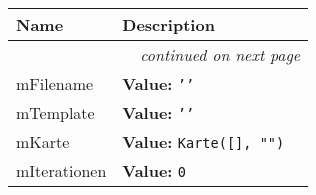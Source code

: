     \vspace{-1cm}
\hspace{\varindent}\begin{longtable}{|p{\varnamewidth}|p{\vardescrwidth}|l}
\cline{1-2}
\cline{1-2} \centering \textbf{Name} & \centering \textbf{Description}& \\
\cline{1-2}
\endhead\cline{1-2}\multicolumn{3}{r}{\small\textit{continued on next page}}\\\endfoot\cline{1-2}
\endlastfoot\raggedright m\-F\-i\-l\-e\-n\-a\-m\-e\- & \raggedright \textbf{Value:} 
{\tt \texttt{'}\texttt{}\texttt{'}}&\\
\cline{1-2}
\raggedright m\-T\-e\-m\-p\-l\-a\-t\-e\- & \raggedright \textbf{Value:} 
{\tt \texttt{'}\texttt{}\texttt{'}}&\\
\cline{1-2}
\raggedright m\-K\-a\-r\-t\-e\- & \raggedright \textbf{Value:} 
{\tt Karte([], "")}&\\
\cline{1-2}
\raggedright m\-I\-t\-e\-r\-a\-t\-i\-o\-n\-e\-n\- & \raggedright \textbf{Value:} 
{\tt 0}&\\
\cline{1-2}
\end{longtable}

